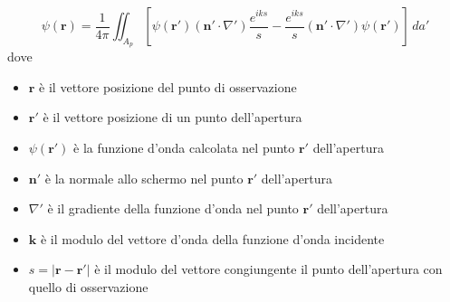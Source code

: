 \begin{equation}
	\psi(\bm{r}) = \frac{1}{4 \pi} \iint_{A_p} \left[ \psi(\bm{r'}) (\bm{n}' \cdot \nabla') \frac{e^{iks}}{s} - \frac{e^{iks}}{s}(\bm{n}' \cdot \nabla') \psi(\bm{r}') \right]  \, da'
\end{equation} dove

\begin{itemize}
	\tightlist
	\item \(\bm{r}\) è il vettore posizione del punto di osservazione
	\item \(\bm{r'}\) è il vettore posizione di un punto dell'apertura
	\item \(\psi(\bm{r'})\) è la funzione d'onda calcolata nel punto \(\bm{r'}\)
	dell'apertura
	\item \(\bm{n}'\) è la normale allo schermo nel punto \(\bm{r'}\)
	dell'apertura
	\item \(\nabla'\) è il gradiente della funzione d'onda nel punto \(\bm{r'}\) dell'apertura
	\item \(\bm{k}\) è il modulo del vettore d'onda della funzione d'onda incidente
	\item \(s = | \bm{r} - \bm{r'}|\) è il modulo del vettore congiungente il punto dell'apertura con quello di osservazione
\end{itemize}

